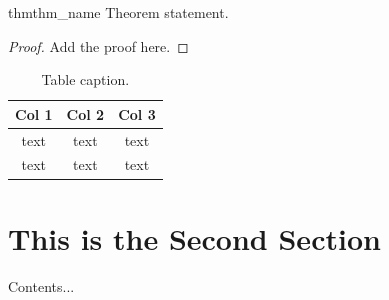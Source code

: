 \begin{restatable}{thm}{thm_name} \label{thm: thm_name}
    Theorem statement.
\end{restatable}
\begin{proof}
    Add the proof here.
\end{proof}

\begin{table}[!hbt]
    \centering
    \begin{tabular}{c|c|c}
        \textbf{Col 1} & \textbf{Col 2} & \textbf{Col 3} \\
        \hline \hline
        text           & text           & text           \\
        \hline
        text           & text           & text           \\
    \end{tabular}
    \caption{Table caption.}
    \label{table: caption}
\end{table}

\section{This is the Second Section}
Contents...